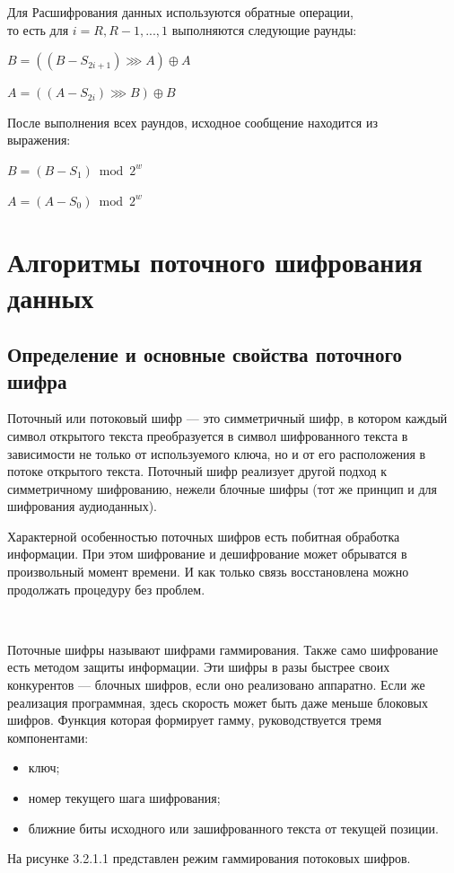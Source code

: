 \documentclass[a4paper]{report}
\begin{document}
Для Расшифрования данных используются обратные операции, \\ то есть для $i = R, R − 1,...,1$ выполняются следующие раунды:

$B=((B-S_{2i+1})\ggg A)\oplus A$

$A=((A-S_{2i})\ggg B)\oplus B$

После выполнения всех раундов, исходное сообщение находится из \\ выражения: 

$B=(B-S_1)\bmod {2^{w}}$

$A=(A-S_0)\bmod {2^{w}}$


\section{Алгоритмы поточного шифрования данных}
\subsection{Определение и основные свойства поточного шифра}
Поточный или потоковый шифр — это симметричный шифр, в котором каждый символ открытого текста преобразуется в символ шифрованного текста в зависимости не только от используемого ключа, но и от его расположения в потоке открытого текста. Поточный шифр реализует другой подход к симметричному шифрованию, нежели блочные шифры (тот же принцип и для шифрования аудиоданных).

Характерной особенностью поточных шифров есть побитная обработка информации. При этом шифрование и дешифрование может обрыватся в произвольный момент времени. И как только связь восстановлена можно продолжать процедуру без проблем.

~

Поточные шифры называют шифрами гаммирования. Также само шифрование есть методом защиты информации. Эти шифры в разы быстрее своих конкурентов — блочных шифров, если оно реализовано аппаратно. Если же реализация программная, здесь скорость может быть даже меньше блоковых шифров. Функция которая формирует гамму, руководствуется тремя компонентами: 

\begin{itemize}
\item ключ;
\item номер текущего шага шифрования;
\item ближние биты исходного или зашифрованного текста от текущей позиции.
\end{itemize}

\newpage
На рисунке 3.2.1.1 представлен режим гаммирования потоковых шифров.
\end{document}
